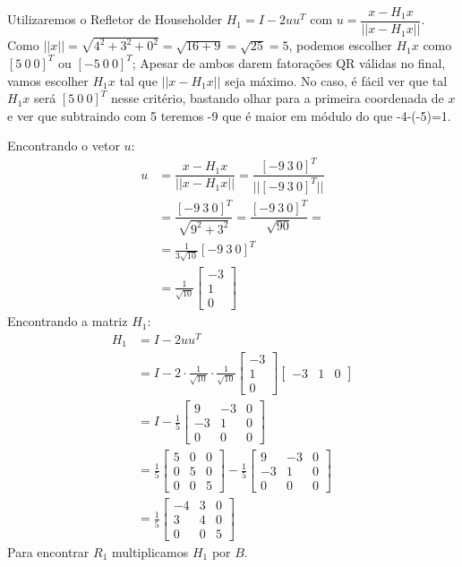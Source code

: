 \documentclass[12pt]{article}
\begin{document}
\begin{enumerate}[a)]
Utilizaremos o Refletor de Householder $H_1=I-2uu^T$ com $u=\dfrac{x-H_1x}{||x-H_1x||}$.
Como $||x||=\sqrt{4^2+3^2+0^2}=\sqrt{16+9}=\sqrt{25}=5$, podemos escolher $H_1x$ como $[5~0~0]^T$ ou $[-5~0~0]^T$; Apesar de ambos darem fatorações QR válidas no final, vamos escolher $H_1x$ tal que $||x-H_1x||$ seja máximo. No caso, é fácil ver que tal $H_1x$ será $[5~0~0]^T$ nesse critério, bastando olhar para a primeira coordenada de $x$ e ver que subtraindo com 5 teremos -9 que é maior em módulo do que -4-(-5)=1.

Encontrando o vetor $u$:
\begin{align*}u&=\dfrac{x-H_1x}{||x-H_1x||}
	=\dfrac{[-9~3~0]^T}{||[-9~3~0]^T||}\\
	&=\dfrac{[-9~3~0]^T}{\sqrt{9^2+3^2}}=\dfrac{[-9~3~0]^T}{\sqrt{90}}=\\
	&=\frac{1}{3\sqrt{10}}[-9~3~0]^T\\
	&=\frac1{\sqrt{10}}\begin{bmatrix}
		-3\\1\\0
	\end{bmatrix}
\end{align*}
Encontrando a matriz $H_1$:
\begin{align*}
	H_1&=I-2uu^T\\
	&=I-2\cdot\frac1{\sqrt{10}}\cdot\frac1{\sqrt{10}}\begin{bmatrix}
		-3\\1\\0\end{bmatrix}\begin{bmatrix}
		-3&1& 0\end{bmatrix}\\
	&=I-\frac15\begin{bmatrix}
		9&-3&0\\
		-3&1&0\\
		0&0&0
	\end{bmatrix}\\
&=\frac15\begin{bmatrix}
	5&0&0\\0&5&0\\0&0&5
\end{bmatrix}-\frac15\begin{bmatrix}
9&-3&0\\
-3&1&0\\
0&0&0
\end{bmatrix}\\
&=\frac15\begin{bmatrix}
	-4&3&0\\3&4&0\\0&0&5
\end{bmatrix}
\end{align*}
Para encontrar $R_1$ multiplicamos $H_1$ por $B$.


\end{enumerate}
\end{document}
